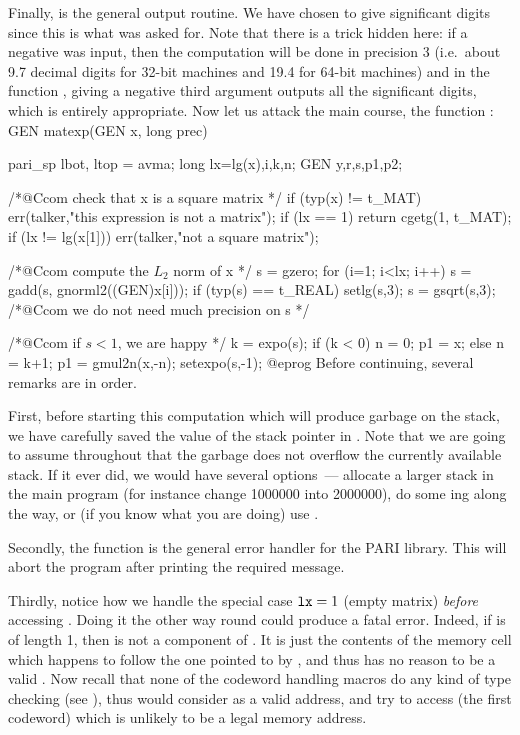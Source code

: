 Finally,  is the general output routine. We have chosen to give
 significant digits since this is what was asked for. Note that there
is a trick hidden here: if a negative  was input, then the computation
will be done in precision 3 (i.e.~about 9.7 decimal digits for 32-bit
machines and 19.4 for 64-bit machines) and in the function , giving
a negative third argument outputs all the significant digits, which is entirely
appropriate. Now let us attack the main course, the function :
%
\bprog
GEN
matexp(GEN x, long prec)
{
  pari_sp lbot, ltop = avma;
  long lx=lg(x),i,k,n;
  GEN y,r,s,p1,p2;

  /*@Ccom check that x is a square matrix */
  if (typ(x) != t_MAT) err(talker,"this expression is not a matrix");
  if (lx == 1) return cgetg(1, t_MAT);
  if (lx != lg(x[1])) err(talker,"not a square matrix");

  /*@Ccom compute the $L_2$ norm of x */
  s = gzero;
  for (i=1; i<lx; i++)
    s = gadd(s, gnorml2((GEN)x[i]));
  if (typ(s) == t_REAL) setlg(s,3);
  s = gsqrt(s,3); /*@Ccom we do not need much precision on s */

  /*@Ccom if $s<1$, we are happy */
  k = expo(s);
  if (k < 0) { n = 0; p1 = x; }
  else { n = k+1; p1 = gmul2n(x,-n); setexpo(s,-1); }@eprog
\noindent
Before continuing, several remarks are in order.

First, before starting this computation which will produce garbage on the
stack, we have carefully saved the value of the stack pointer  in
. Note that we are going to assume throughout that the garbage does
not overflow the currently available stack. If it ever did, we would
have several options~--- allocate a larger stack in the main program (for
instance change 1000000 into 2000000), do some ing along the
way, or (if you know what you are doing) use .

Secondly, the  function is the general error handler for the
PARI library. This will abort the program after printing the required
message.

Thirdly, notice how we handle the special case ${\tt lx} = 1$ (empty matrix)
\emph{before} accessing . Doing it the other way round could
produce a fatal error. Indeed, if  is of length 1, then  is
not a component of . It is just the contents of the memory cell which
happens to follow the one pointed to by , and thus has no reason to be
a valid . Now recall that none of the codeword handling macros do
any kind of type checking (see ), thus  would
consider  as a valid address, and try to access 
(the first codeword) which is unlikely to be a legal memory address.

}
